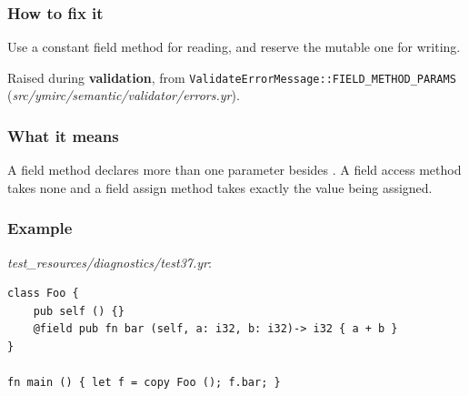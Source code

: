 \subsubsection*{How to fix it}

Use a constant field method for reading, and reserve the mutable one for writing.

\label{sec:codes:e4066}

Raised during \textbf{validation}, from \texttt{ValidateErrorMessage::\allowbreak{}FIELD\_\allowbreak{}METHOD\_\allowbreak{}PARAMS} (\textit{src/\allowbreak{}ymirc/\allowbreak{}semantic/\allowbreak{}validator/\allowbreak{}errors.yr}).

\subsubsection*{What it means}

A field method declares more than one parameter besides . A field access method takes none and a field assign method takes exactly the value being assigned.

\subsubsection*{Example}

\textit{test\_\allowbreak{}resources/\allowbreak{}diagnostics/\allowbreak{}test37.yr}:

\begin{lstlisting}[style=coloredverbatimError]
class Foo {
    pub self () {}
    @field pub fn bar (self, a: i32, b: i32)-> i32 { a + b }
}

fn main () { let f = copy Foo (); f.bar; }
\end{lstlisting}

